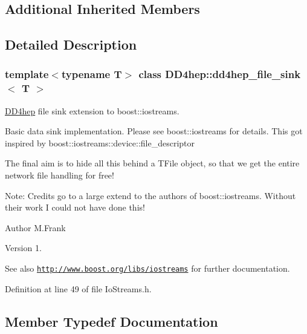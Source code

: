 \subsection*{Additional Inherited Members}


\subsection{Detailed Description}
\subsubsection*{template$<$typename T$>$\newline
class D\+D4hep\+::dd4hep\+\_\+file\+\_\+sink$<$ T $>$}

\hyperlink{namespace_d_d4hep}{D\+D4hep} file sink extension to boost\+::iostreams. 

Basic data sink implementation. Please see boost\+::iostreams for details. This got inspired by boost\+::iostreams\+::device\+::file\+\_\+descriptor

The final aim is to hide all this behind a T\+File object, so that we get the entire network file handling for free!

Note\+: Credits go to a large extend to the authors of boost\+::iostreams. Without their work I could not have done this!

\begin{DoxyAuthor}{Author}
M.\+Frank 
\end{DoxyAuthor}
\begin{DoxyVersion}{Version}
1.
\end{DoxyVersion}
\begin{DoxySeeAlso}{See also}
\href{http://www.boost.org/libs/iostreams}{\tt http\+://www.\+boost.\+org/libs/iostreams} for further documentation. 
\end{DoxySeeAlso}


Definition at line 49 of file Io\+Streams.\+h.



\subsection{Member Typedef Documentation}
\hypertarget{class_d_d4hep_1_1dd4hep__file__sink_a358c907508083da65c4cd31725331460}{}\label{class_d_d4hep_1_1dd4hep__file__sink_a358c907508083da65c4cd31725331460} 
